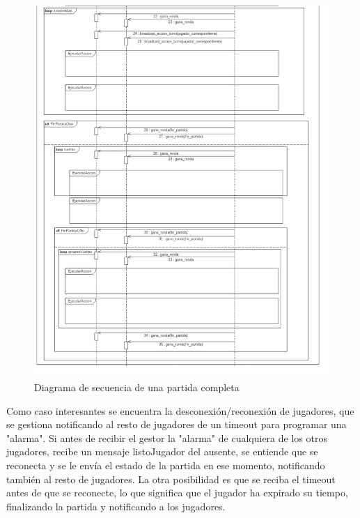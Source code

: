 \begin{figure}[H]
\includegraphics[width=\linewidth]{figuras/diagramasSecuencia/partidaCompleta2.png}
\caption{Diagrama de secuencia de una partida completa}
\label{fig:partidaCompleta2}
\end{figure}

Como caso interesantes se encuentra la desconexión/reconexión de jugadores, que se gestiona notificando al resto de jugadores
de un timeout para programar una "alarma". Si antes de recibir el gestor la "alarma" de cualquiera de los otros jugadores, recibe
un mensaje listoJugador del ausente, se entiende que se reconecta y se le envía el estado de la partida en ese momento, notificando
también al resto de jugadores. La otra posibilidad es que se reciba el timeout antes de que se reconecte, lo que significa que
el jugador ha expirado su tiempo, finalizando la partida y notificando a los jugadores.\\

